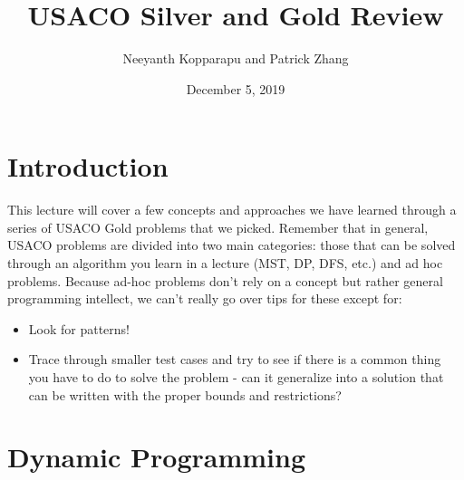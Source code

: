 \documentclass{article}
\title{USACO Silver and Gold Review}
\author{Neeyanth Kopparapu and Patrick Zhang}
\date{December 5, 2019}
\begin{document}
\maketitle

\section*{Introduction}

This lecture will cover a few concepts and approaches we have learned through a series of USACO Gold problems that we picked. Remember that in general, USACO problems are divided into two main categories: those that can be solved through an algorithm you learn in a lecture (MST, DP, DFS, etc.) and ad hoc problems. Because ad-hoc problems don't rely on a concept but rather general programming intellect, we can't really go over tips for these except for:
\begin{itemize}
    \item Look for patterns!
    \item Trace through smaller test cases and try to see if there is a common thing you have to do to solve the problem - can it generalize into a solution that can be written with the proper bounds and restrictions?
\end{itemize}

\section{Dynamic Programming}
\end{document}
